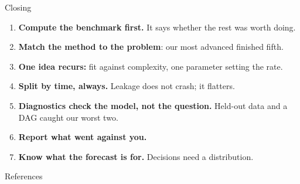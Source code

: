 \documentclass[aspectratio=169, 11pt]{beamer}
\begin{document}
\begin{frame}{Closing}
  \begin{keybox}
    {\small
    \begin{enumerate}\itemsep3pt
      \item \textbf{Compute the benchmark first.} It says whether the rest was worth doing.
      \item \textbf{Match the method to the problem}: our most advanced finished fifth.
      \item \textbf{One idea recurs:} fit against complexity, one parameter setting the rate.
      \item \textbf{Split by time, always.} Leakage does not crash; it flatters.
      \item \textbf{Diagnostics check the model, not the question.} Held-out data and a DAG caught our worst two.
      \item \textbf{Report what went against you.}
      \item \textbf{Know what the forecast is for.} Decisions need a distribution.
    \end{enumerate}
    }
  \end{keybox}

  \vspace{0.05cm}
\end{frame}

\begin{frame}[allowframebreaks]{References}
  \printbibliography[heading=none]
\end{frame}
\end{document}
